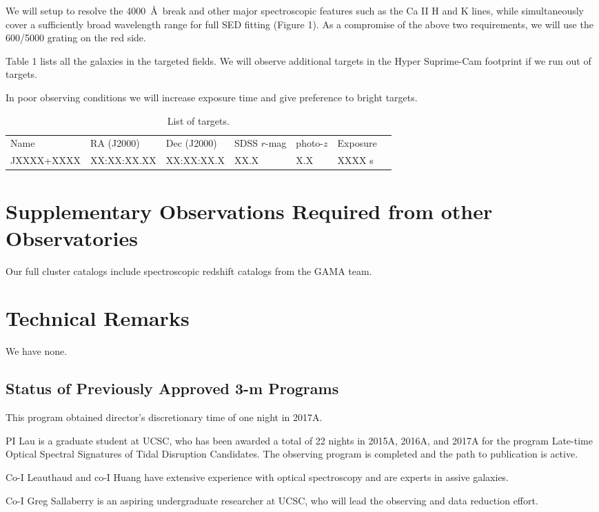 \documentclass[letterpaper,12pt,dvips]{article}
\begin{document}
We will setup to resolve the 4000~\AA\ break and other major spectroscopic features such as 
the Ca II H and K lines, while simultaneously cover a sufficiently broad wavelength range for full 
SED fitting (Figure 1). As a compromise of the above two requirements, we will use the 600/5000 
grating on the red side. 

Table 1 lists all the galaxies in the targeted fields. We will observe additional targets in the 
Hyper Suprime-Cam footprint if we run out of targets. 

In poor observing conditions we will increase exposure time and give preference to bright targets. 

\begin{table}
\caption{List of targets.}
\begin{tabular}{lllllll}
\hline
Name & RA (J2000) & Dec (J2000) & SDSS $r$-mag & photo-$z$ & Exposure \\
JXXXX+XXXX & XX:XX:XX.XX & XX:XX:XX.X & XX.X & X.X & XXXX s & \\
\hline
\end{tabular}
\end{table}

\section{Supplementary Observations Required from other Observatories}

Our full cluster catalogs include spectroscopic redshift catalogs from the GAMA team. 

\section{Technical Remarks}

We have none. 

\subsection{Status of Previously Approved 3-m Programs}

This program obtained director's discretionary time of one night in 2017A. 

PI Lau is a graduate student at UCSC, who has been awarded a total of 22 nights in 2015A, 2016A, 
and 2017A for the program Late-time Optical Spectral Signatures of Tidal Disruption Candidates. 
The observing program is completed and the path to publication is active. 

Co-I Leauthaud and co-I Huang have extensive experience with optical spectroscopy and are experts 
in assive galaxies. 

Co-I Greg Sallaberry is an aspiring undergraduate researcher at UCSC, who will lead the observing 
and data reduction effort. 
\end{document}
